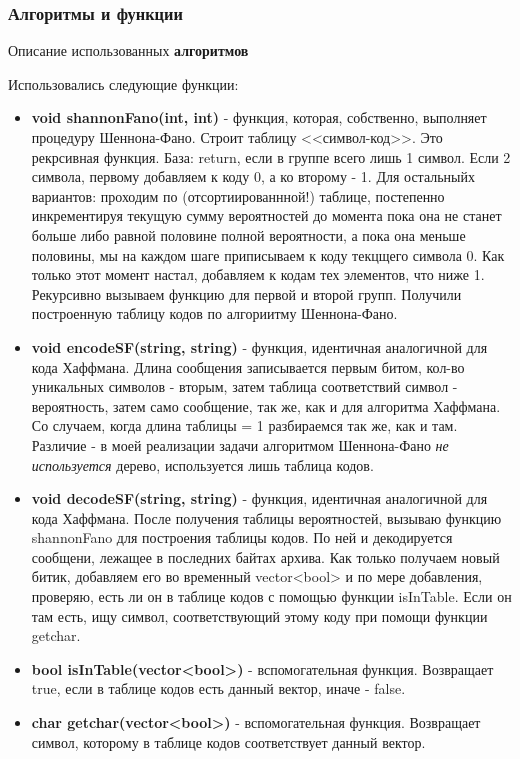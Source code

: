 \documentclass[a4paper, 12pt]{article}
\begin{document}
\subsubsection{Алгоритмы и функции}
Описание использованных \textbf{алгоритмов}

Использовались следующие функции:
\begin{itemize}
  \item \textbf{void shannonFano(int, int)} - функция, которая, собственно, выполняет
  процедуру Шеннона-Фано. Строит таблицу <<символ-код>>. Это рекрсивная функция. База:
  return, если в группе всего лишь 1 символ. Если 2 символа, первому добавляем к коду 0, а
  ко второму - 1. Для остальныйх вариантов: проходим по (отсортиированнной!) таблице, постепенно
  инкрементируя текущую сумму вероятностей до момента пока она не станет больше либо равной половине
  полной вероятности, а пока она меньше половины, мы на каждом шаге приписываем
  к коду текцщего символа 0. Как только этот момент настал, добавляем к кодам тех элементов, что ниже 1.
  Рекурсивно вызываем функцию для первой и второй групп. Получили построенную таблицу кодов по алгориитму
  Шеннона-Фано.
  \item \textbf{void encodeSF(string, string)} - функция, идентичная аналогичной для кода Хаффмана.
  Длина сообщения записывается первым битом, кол-во уникальных символов - вторым, затем таблица соответствий
  символ - вероятность, затем само сообщение, так же, как и для алгоритма Хаффмана. Со случаем, когда длина
  таблицы = 1 разбираемся так же, как и там. Различие - в моей реализации задачи алгоритмом Шеннона-Фано
  \textit{не используется} дерево, используется лишь таблица кодов.
  \item \textbf{void decodeSF(string, string)} - функция, идентичная аналогичной для кода Хаффмана.
  После получения таблицы вероятностей, вызываю функцию shannonFano для построения таблицы кодов. По ней
  и декодируется сообщени, лежащее в последних байтах архива. Как только получаем новый битик,
  добавляем его во временный vector<bool> и по мере добавления, проверяю, есть ли он в таблице кодов
  с помощью функции isInTable. Если он там есть, ищу символ, соответствующий этому коду при помощи
  функции getchar.
  \item \textbf{bool isInTable(vector<bool>)} - вспомогательная функция. Возвращает true, если в
  таблице кодов есть данный вектор, иначе - false.
  \item \textbf{char getchar(vector<bool>)} - вспомогательная функция. Возвращает символ, которому
  в таблице кодов соответствует данный вектор.
\end{itemize}
\end{document}

